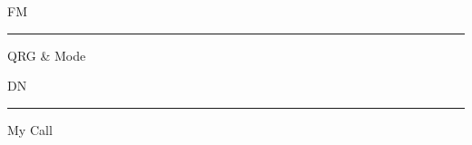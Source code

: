 \documentclass[a4paper,10pt]{article}
\begin{document}
  \bigskip
  \hspace{1cm}
  \begin{minipage}[t]{0.33\textwidth}
    \hspace{3cm} {\Large FM}\vspace{0.5em}
      \centering
      \hrule
      \vspace{0.5ex}
      \small QRG \& Mode
  \end{minipage}
  \hfill
  \begin{minipage}[t]{0.33\textwidth}
    \hspace{-2cm} {\Large DN}\vspace{0.5em}
      \centering
      \hrule
      \vspace{0.5ex}
      \small My Call
  \end{minipage}
  \hspace{1cm}
\end{document}
